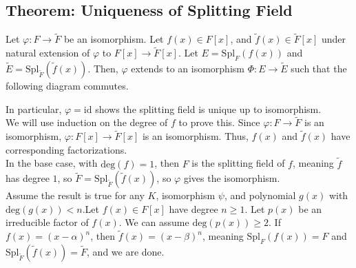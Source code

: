 \documentclass[10pt]{extarticle}
\begin{document}
  \subsection{Theorem: Uniqueness of Splitting Field}%
  Let $\varphi: F\rightarrow \tilde{F}$ be an isomorphism. Let $f(x) \in F[x]$, and $\tilde{f}(x) \in \tilde{F}[x]$ under natural extension of $\varphi$ to $F[x] \rightarrow \tilde{F}[x]$. Let $E = \text{Spl}_F(f(x))$ and $\tilde{E} = \text{Spl}_{\tilde{F}}(\tilde{f}(x))$. Then, $\varphi$ extends to an isomorphism $\Phi: E\rightarrow \tilde{E}$ such that the following diagram commutes.
  \begin{center}
  \end{center}
  In particular, $\varphi = \text{id}$ shows the splitting field is unique up to isomorphism.\\

  We will use induction on the degree of $f$ to prove this. Since $\varphi: F\rightarrow \tilde{F}$ is an isomorphism, $\varphi: F[x]\rightarrow \tilde{F}[x]$ is an isomorphism. Thus, $f(x)$ and $\tilde{f}(x)$ have corresponding factorizations.\\

  In the base case, with $\text{deg}(f) = 1$, then $F$ is the splitting field of $f$, meaning $\tilde{f}$ has degree $1$, so $\tilde{F} = \text{Spl}_{\tilde{F}}(\tilde{f}(x))$, so $\varphi$ gives the isomorphism.\\

  Assume the result is true for any $K$, isomorphism $\psi$, and polynomial $g(x)$ with $\text{deg}(g(x)) < n$.Let $f(x)\in F[x]$ have degree $n\geq 1$. Let $p(x)$ be an irreducible factor of $f(x)$. We can assume $\text{deg}(p(x)) \geq 2$. If $f(x) = (x-\alpha)^n$, then $\tilde{f}(x) = (x-\beta)^n$, meaning $\text{Spl}_F(f(x)) = F$ and $\text{Spl}_{\tilde{F}}(\tilde{f}(x)) = \tilde{F}$, and we are done.\\
\end{document}
